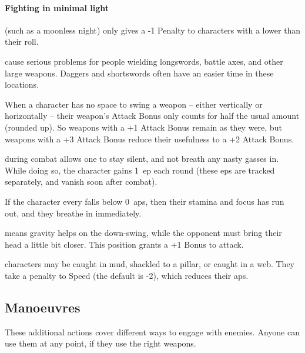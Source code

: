 \begin{multicols}{2}
\paragraph{Fighting in minimal light}
(such as a moonless night)
only gives a -1 Penalty to characters with a  lower than their roll.

cause serious problems for people wielding longswords, battle axes, and other large weapons.
Daggers and shortswords often have an easier time in these locations.

When a character has no space to swing a weapon -- either vertically or horizontally -- their weapon's Attack Bonus only counts for half the usual amount (rounded up).
So weapons with a +1 Attack Bonus remain as they were, but weapons with a +3 Attack Bonus reduce their usefulness to a +2 Attack Bonus.

during combat allows one to stay silent, and not breath any nasty gasses in.
While doing so, the character gains 1~\gls{ep} each round (these \glspl{ep} are tracked separately, and vanish soon after combat).

If the character every falls below 0~\glspl{ap}, then their stamina and focus has run out, and they breathe in immediately.

means gravity helps on the down-swing, while the opponent must bring their head a little bit closer.
This position grants a +1 Bonus to attack.

\label{trapped}
characters may be caught in mud, shackled to a pillar, or caught in a web.
They take a penalty to Speed (the default is -2), which reduces their \glspl{ap}.
\label{prone}

\subsection{Manoeuvres}

These additional actions cover different ways to engage with enemies.
Anyone can use them at any point, if they use the right weapons.


\end{multicols}
